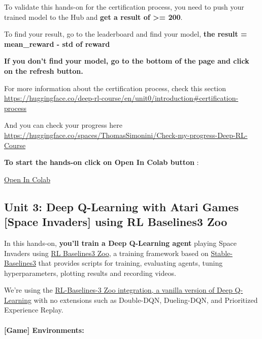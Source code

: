 \documentclass[11pt,a4paper]{article}
\begin{document}
To validate this hands-on for the certification process, you need to push your trained model to the Hub and \textbf{get a result of \textgreater= 200}.

To find your result, go to the leaderboard and find your model, \textbf{the result = mean\_reward - std of reward}

\textbf{If you don't find your model, go to the bottom of the page and click on the refresh button.}

For more information about the certification process, check this section \url{https://huggingface.co/deep-rl-course/en/unit0/introduction#certification-process}

And you can check your progress here \url{https://huggingface.co/spaces/ThomasSimonini/Check-my-progress-Deep-RL-Course}

\textbf{To start the hands-on click on Open In Colab button} :

\href{https://colab.research.google.com/github/huggingface/deep-rl-class/blob/master/notebooks/unit3/unit3.ipynb}{Open In Colab}

\subsection{Unit 3: Deep Q-Learning with Atari Games {[}Space Invaders{]} using RL Baselines3 Zoo}\label{unit-3-deep-q-learning-with-atari-games-space-invaders-using-rl-baselines3-zoo}


In this hands-on, \textbf{you'll train a Deep Q-Learning agent} playing Space Invaders using \href{https://github.com/DLR-RM/rl-baselines3-zoo}{RL Baselines3 Zoo}, a training framework based on \href{https://stable-baselines3.readthedocs.io/en/master/}{Stable-Baselines3} that provides scripts for training, evaluating agents, tuning hyperparameters, plotting results and recording videos.

We're using the \href{https://stable-baselines3.readthedocs.io/en/master/modules/dqn.html}{RL-Baselines-3 Zoo integration, a vanilla version of Deep Q-Learning} with no extensions such as Double-DQN, Dueling-DQN, and Prioritized Experience Replay.

\paragraph{{[}Game{]} Environments:}\label{game-environments}
\end{document}
